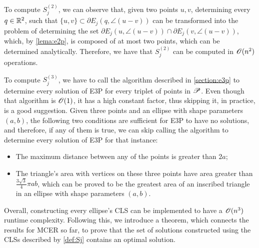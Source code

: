 To compute $S_j^{(2)}$, we can observe that, given two points $u, v$, determining every $q\in\mathbb{R}^2$, such that $\{u,v\}\subset\partial E_j(q, \angle(u-v))$ can be transformed into the problem of determining the set $\partial E_j(u, \angle(u-v)) \cap \partial E_j(v, \angle(u-v))$, which, by \autoref{lema:e2p}, is composed of at most two points, which can be determined analytically. Therefore, we have that $S_j^{(2)}$ can be computed in $\mathscr{O}(n^2)$ operations.

To compute $S_j^{(3)}$, we have to call the algorithm described in \autoref{section:e3p} to determine every solution of E3P for every triplet of points in $\mathscr{P}$. Even though that algorithm is $\mathscr{O}(1)$, it has a high constant factor, thus skipping it, in practice, is a good suggestion.
Given three points and an ellipse with shape parameters $(a, b)$, the following two conditions are sufficient for E3P to have no solutions, and therefore, if any of them is true, we can skip calling the algorithm to determine every solution of E3P for that instance:
\begin{itemize}
	\item The maximum distance between any of the points is greater than $2a$;
	\item The triangle's area with vertices on these three points have area greater than $\frac{3\sqrt{3}}{4}\pi ab$, which can be proved to be the greatest area of an inscribed triangle in an ellipse with shape parameters $(a, b)$.
\end{itemize}

Overall, constructing every ellipse's CLS can be implemented to have a $\mathscr{O}(n^3)$ runtime complexity.
Following this, we introduce a theorem, which connects the results for MCER so far, to prove that the set of solutions constructed using the CLSs described by \autoref{def:Sj} contains an optimal solution.


